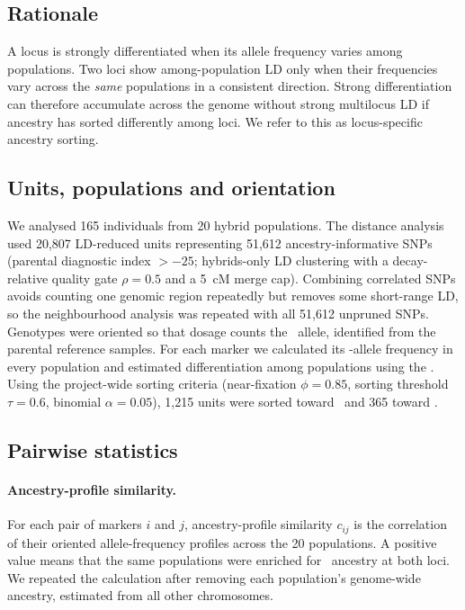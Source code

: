\subsection{Rationale}

A locus is strongly differentiated when its allele frequency varies among populations. Two loci show among-population LD only when their frequencies vary across the \emph{same} populations in a consistent direction. Strong differentiation can therefore accumulate across the genome without strong multilocus LD if ancestry has sorted differently among loci. We refer to this as locus-specific ancestry sorting.

\subsection{Units, populations and orientation}

We analysed 165 individuals from 20 hybrid populations. The distance analysis used 20,807 LD-reduced units representing 51,612 ancestry-informative SNPs (parental diagnostic index $>-25$; hybrids-only LD clustering with a decay-relative quality gate $\rho=0.5$ and a 5~cM merge cap). Combining correlated SNPs avoids counting one genomic region repeatedly but removes some short-range LD, so the neighbourhood analysis was repeated with all 51,612 unpruned SNPs. Genotypes were oriented so that dosage counts the \Fa\ allele, identified from the parental reference samples. For each marker we calculated its \Fa-allele frequency in every population and estimated differentiation among populations using the \citet{weir1984estimating} \FST. Using the project-wide sorting criteria (near-fixation $\phi=0.85$, sorting threshold $\tau=0.6$, binomial $\alpha=0.05$), 1,215 units were sorted toward \Fa\ and 365 toward \Fp.

\subsection{Pairwise statistics}

\paragraph{Ancestry-profile similarity.} For each pair of markers $i$ and $j$, ancestry-profile similarity $c_{ij}$ is the correlation of their oriented allele-frequency profiles across the 20 populations. A positive value means that the same populations were enriched for \Fa\ ancestry at both loci. We repeated the calculation after removing each population's genome-wide ancestry, estimated from all other chromosomes.

